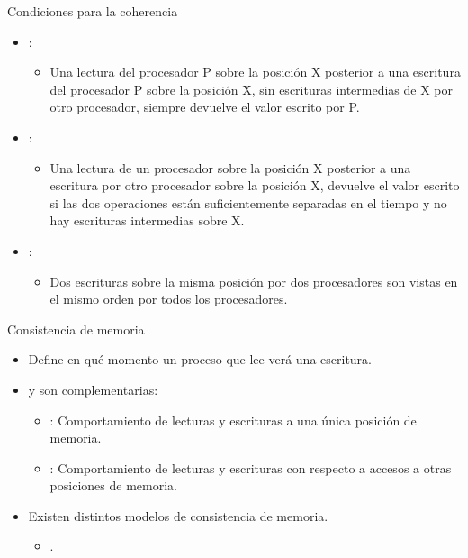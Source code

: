 \begin{frame}[t]{Condiciones para la coherencia}
\begin{itemize}
  \item {}:
    \begin{itemize}
      \item Una lectura del procesador P sobre la posición X posterior a una escritura del procesador P sobre la posición X, sin escrituras intermedias de X por otro procesador, siempre devuelve el valor escrito por P.
    \end{itemize}

  \item {}:
    \begin{itemize}
      \item Una lectura de un procesador sobre la posición X posterior a una escritura por otro procesador sobre la posición X, devuelve el valor escrito si las dos operaciones están suficientemente separadas en el tiempo y no hay escrituras intermedias sobre X.
    \end{itemize}

  \item {}:
    \begin{itemize}
      \item Dos escrituras sobre la misma posición por dos procesadores son vistas en el mismo orden por todos los procesadores.
    \end{itemize}

\end{itemize}
\end{frame}

\begin{frame}[t]{Consistencia de memoria}
\begin{itemize}
  \item Define en qué momento un proceso que lee verá una escritura.

  \item {} y  son complementarias:
    \begin{itemize}
      \item {}: Comportamiento de lecturas y escrituras a una única posición de memoria.
      \item {}: Comportamiento de lecturas y escrituras con respecto a accesos a otras posiciones de memoria.
    \end{itemize}

  \item Existen distintos modelos de consistencia de memoria.
    \begin{itemize}
      \item {}.
    \end{itemize}

\end{itemize}
\end{frame}
